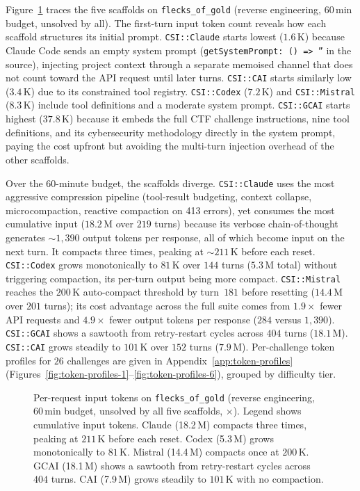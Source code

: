 Figure~\ref{fig:token-growth} traces the five scaffolds on \texttt{flecks\_of\_gold} (reverse engineering, 60\,min budget, unsolved by all). The first-turn input token count reveals how each scaffold structures its initial prompt. \texttt{CSI::Claude} starts lowest ($1.6$\,K) because Claude Code sends an empty system prompt (\texttt{getSystemPrompt:~()~=>~''} in the source), injecting project context through a separate memoised channel that does not count toward the API request until later turns. \texttt{CSI::CAI} starts similarly low ($3.4$\,K) due to its constrained tool registry. \texttt{CSI::Codex} ($7.2$\,K) and \texttt{CSI::Mistral} ($8.3$\,K) include tool definitions and a moderate system prompt. \texttt{CSI::GCAI} starts highest ($37.8$\,K) because it embeds the full CTF challenge instructions, nine tool definitions, and its cybersecurity methodology directly in the system prompt, paying the cost upfront but avoiding the multi-turn injection overhead of the other scaffolds.

Over the 60-minute budget, the scaffolds diverge. \texttt{CSI::Claude} uses the most aggressive compression pipeline (tool-result budgeting, context collapse, microcompaction, reactive compaction on 413 errors), yet consumes the most cumulative input ($18.2$\,M over $219$ turns) because its verbose chain-of-thought generates $\sim\!1{,}390$ output tokens per response, all of which become input on the next turn. It compacts three times, peaking at $\sim\!211$\,K before each reset. \texttt{CSI::Codex} grows monotonically to $81$\,K over $144$ turns ($5.3$\,M total) without triggering compaction, its per-turn output being more compact. \texttt{CSI::Mistral} reaches the $200$\,K auto-compact threshold by turn~$181$ before resetting ($14.4$\,M over $201$ turns); its cost advantage across the full suite comes from $1.9\times$ fewer API requests and $4.9\times$ fewer output tokens per response ($284$ versus $1{,}390$). \texttt{CSI::GCAI} shows a sawtooth from retry-restart cycles across $404$ turns ($18.1$\,M). \texttt{CSI::CAI} grows steadily to $101$\,K over $152$ turns ($7.9$\,M). Per-challenge token profiles for $26$ challenges are given in Appendix~\ref{app:token-profiles} (Figures~\ref{fig:token-profiles-1}--\ref{fig:token-profiles-6}), grouped by difficulty tier.

\begin{figure}[t]
\centering
\resizebox{\columnwidth}{!}{}
\caption{Per-request input tokens on \texttt{flecks\_of\_gold} (reverse engineering, 60\,min budget, unsolved by all five scaffolds, $\times$). Legend shows cumulative input tokens. Claude (18.2\,M) compacts three times, peaking at $211$\,K before each reset. Codex (5.3\,M) grows monotonically to $81$\,K. Mistral (14.4\,M) compacts once at $200$\,K. GCAI (18.1\,M) shows a sawtooth from retry-restart cycles across $404$ turns. CAI (7.9\,M) grows steadily to $101$\,K with no compaction.}
\label{fig:token-growth}
\end{figure}
